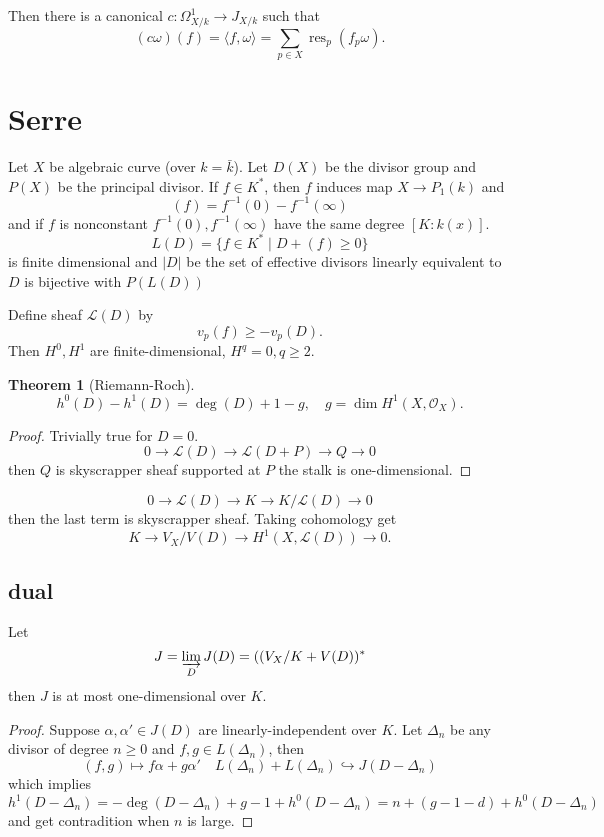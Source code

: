 \documentclass[leqno]{amsart}
\newcommand{\oo}{\mathcal O}
\newcommand{\1}{\mathbf{1}}
\DeclareMathOperator{\res}{res}
\newtheorem{thm}{Theorem}[section]
\theoremstyle{definition}
\theoremstyle{remark}
\begin{document}
Then there is a canonical 
 $c\colon \Omega^1_{X/k}\to J_{X/k}$ such that
 \[
	 (c\omega)(f)=\langle f,\omega\rangle
	 =\sum_{p\in X}\res_p(f_p\omega).
 \]


\section{Serre}

Let $X$ be algebraic curve
(over  $k=\bar{k}$).
Let  $D(X)$ be the divisor group
and  $P(X)$ be the principal divisor.
If  $f\in K^*$, then
$f$ induces map  $X\to P_1(k)$ and 
 \[
	 (f)=f^{-1}(0)-f^{-1}(\infty)
\]
and if  $f$ is nonconstant
$f^{-1}(0), f^{-1}(\infty)$ 
have the same degree $[K:k(x)]$.
\[
	L(D)=\{f\in K^*\mid D+(f)\geq 0\}
\]
is finite dimensional
and $|D|$ be the set of 
effective divisors linearly equivalent to  $D$
is bijective with  $P(L(D))$

Define sheaf $\mathcal{L}(D)$
by 
 \[
	 v_p(f)\geq -v_p(D).
\]
Then $H^0,H^1$ are finite-dimensional,
 $H^q=0,q\geq 2$. 

 \begin{thm}[Riemann-Roch]
 \[
	 h^0(D)-h^1(D)=\deg(D)+1-g,\quad
	 g=\dim H^1(X,\oo_X).
 \]	
 \end{thm}

\begin{proof}
	Trivially true for $D=0$.
	 \[
		0\to
		\mathcal{L}(D)\to
		\mathcal{L}(D+P)\to Q\to 0
	\]
	then $Q$ is skyscrapper sheaf supported at  $P$
	the stalk is one-dimensional.
\end{proof}

\[
	0\to \mathcal{L}(D)\to K\to K/\mathcal{L}(D)\to 0
\]
then the last term is skyscrapper sheaf. Taking 
cohomology get
\[
	K\to V_X/V(D)\to H^1(X,\mathcal{L}(D))\to 0.
\]

\subsection{dual}

Let 
\[
	J=\varinjlim_D J(D)=((V_X/K+V(D))^*
\]
then $J$ is at most one-dimensional over  $K$.
 \begin{proof}
	 Suppose $\alpha,\alpha'\in J(D)$
	 are linearly-independent over  $K$.
	 Let $\Delta_n$ be any divisor of
	 degree  $n\geq 0$ and  $f,g\in L(\Delta_n)$,
	 then
	  \[
		  (f,g)\mapsto f\alpha+g\alpha'\quad
		  L(\Delta_n)+L(\Delta_n)\hookrightarrow 
		  J(D-\Delta_n)
	 \]
	 which implies 
	 \[
		 h^1(D-\Delta_n)=-\deg(D-\Delta_n)
		 +g-1+h^0(D-\Delta_n)
		 =n+(g-1-d)+h^0(D-\Delta_n)
	 \]
and get contradition when $n$ is large.
\end{proof}
\end{document}
